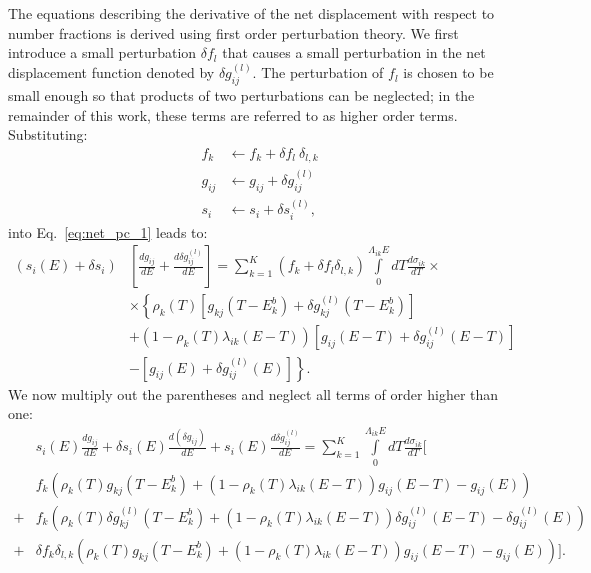 \documentclass[review]{elsarticle}
\begin{document}
The equations describing the derivative of the net displacement with respect to number fractions is derived using first order perturbation theory. We first introduce a small perturbation $\delta f_l$ that causes a small perturbation in the net displacement function denoted by $\delta g_{ij}^{(l)}$. The perturbation of $f_l$ is chosen to be small enough so that products of two perturbations can be neglected; in the remainder of this work, these terms are referred to as higher order terms. Substituting:
\begin{align}
   f_k & \leftarrow f_k + \delta f_l ~\delta_{l,k} \nonumber \\
    g_{ij} & \leftarrow g_{ij} + \delta g_{ij}^{(l)} \nonumber \\
    s_i & \leftarrow s_i +\delta s_i^{(l)},
\end{align}
into Eq.~\ref{eq:net_pc_1} leads to:
\begin{align}
 \left(s_i(E) + \delta s_i \right)&\left[ \frac{d g_{ij}}{dE} + \frac{d \delta g_{ij}^{(l)}}{dE} \right] = \sum\limits_{k=1}^K \left( f_k + \delta f_l \delta_{l,k}  \right)
  \int\limits_0^{\Lambda_{ik}E} dT \frac{d \sigma_{ik}}{dT}  \times
 \nonumber \\
 &\times \left \{ \rho_k(T) \left[ g_{kj}(T-E_k^b) + \delta g^{(l)}_{kj}(T-E_k^b)  \right] \right . \nonumber \\
 &+ (1 - \rho_k(T) \lambda_{ik}(E-T) ) \left[ g_{ij}(E-T) + \delta g^{(l)}_{ij}(E-T) \right]  \nonumber \\
 & \left . - \left[  g_{ij}(E) + \delta g^{(l)}_{ij}(E) \right]   \right\}.
\end{align}
We now multiply out the parentheses and neglect all terms of order higher than one:
\begin{align}
 &s_i(E) \frac{d g_{ij}}{dE} + \delta s_i(E)  \frac{d (\delta g_{ij})}{dE}  +  s_i(E)\frac{d \delta g_{ij}^{(l)}}{dE} 
   = \sum\limits_{k=1}^K \int\limits_{0}^{\Lambda_{ik} E} dT \frac{d \sigma_{ik}}{dT} \Bigg [ 
 \nonumber \\
 & f_k \left (  \rho_k(T) g_{kj}(T-E_k^b)   + (1 - \rho_k(T) \lambda_{ik}(E-T) ) g_{ij}(E-T)  - g_{ij}(E) \right ) \nonumber \\
 +& f_k \left (  \rho_k(T) \delta g_{kj}^{(l)}(T-E_k^b)   + (1 - \rho_k(T) \lambda_{ik}(E-T) ) \delta g_{ij}^{(l)}(E-T)  - \delta g_{ij}^{(l)}(E) \right ) \nonumber \\
 +&\delta   f_k \delta_{l,k} \left (  \rho_k(T) g_{kj}(T-E_k^b)   + (1 - \rho_k(T) \lambda_{ik}(E-T) ) g_{ij}(E-T)  - g_{ij}(E) \right ) \Bigg ].
\end{align}
\end{document}
